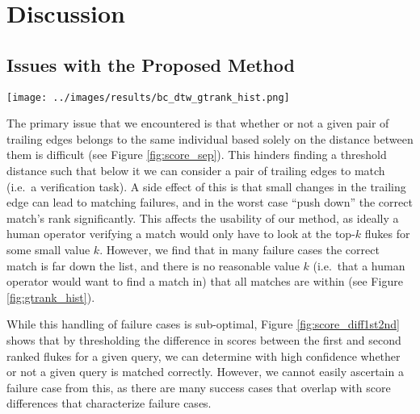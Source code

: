 
\chapter{Discussion} \label{sec:discussion}

\section{Issues with the Proposed Method}

\begin{figure*}[t]%
\centering
\texttt{[image: ../images/results/bc\_dtw\_gtrank\_hist.png]}
\caption{\textbf{Histogram of Ground-Truth Ranks}. Note that the histogram ranges are uneven to better show the lower end of the range. In order to have all matches found within the top-$k$ matches we would have to set $k = 414$.}
\label{fig:gtrank_hist}
\end{figure*}

The primary issue that we encountered is that whether or not a given pair of trailing edges belongs to the same individual based solely on the distance between them is difficult (see Figure \ref{fig:score_sep}).
This hinders finding a threshold distance such that below it we can consider a pair of trailing edges to match (i.e.\ a verification task).
A side effect of this is that small changes in the trailing edge can lead to matching failures, and in the worst case ``push down'' the correct match's rank significantly.
This affects the usability of our method, as ideally a human operator verifying a match would only have to look at the top-$k$ flukes for some small value $k$.
However, we find that in many failure cases the correct match is far down the list, and there is no reasonable value $k$ (i.e.\ that a human operator would want to find a match in) that all matches are within (see Figure \ref{fig:gtrank_hist}). 

While this handling of failure cases is sub-optimal, Figure \ref{fig:score_diff1st2nd} shows that by thresholding the difference in scores between the first and second ranked flukes for a given query, we can determine with high confidence whether or not a given query is matched correctly.
However, we cannot easily ascertain a failure case from this, as there are many success cases that overlap with score differences that characterize failure cases.


